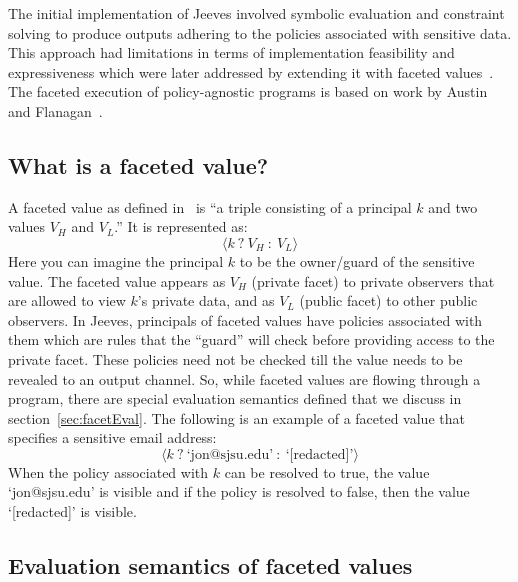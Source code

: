The initial implementation of Jeeves involved symbolic evaluation and constraint
solving to produce outputs adhering to the policies associated with sensitive data.
This approach had limitations in terms of implementation feasibility and expressiveness
which were later addressed by extending it with faceted values~\cite{FacetedJeeves}.
The faceted execution of policy-agnostic programs is based on work by Austin and
Flanagan~\cite{Faceted}.

\subsection{What is a faceted value?}
A faceted value as defined in~\cite{Faceted} is ``a triple consisting of a principal
$k$ and two values $V_H$ and $V_L$.'' It is represented as:
\[\langle k~?~V_H~:~V_L \rangle\]
Here you can imagine the principal $k$ to be the owner/guard of the sensitive value.
The faceted value appears as $V_H$ (private facet) to private observers that are
allowed to view $k$'s private data, and as $V_L$ (public facet) to other public
observers. In Jeeves, principals of faceted values have policies associated with
them which are rules that the ``guard'' will check before providing access to the
private facet. These policies need not be checked till the value needs to be revealed
to an output channel. So, while faceted values are flowing through a program, there
are special evaluation semantics defined that we discuss in section~\ref{sec:facetEval}.
The following is an example of a faceted value that specifies a sensitive email
address:
\[\langle k~?~\text{`jon@sjsu.edu'}~:~\text{`[redacted]'} \rangle\]
When the policy associated with $k$ can be resolved to true, the value `jon@sjsu.edu'
is visible and if the policy is resolved to false, then the value `[redacted]' is
visible.

\subsection{Evaluation semantics of faceted values \label{sec:facetEval}}


